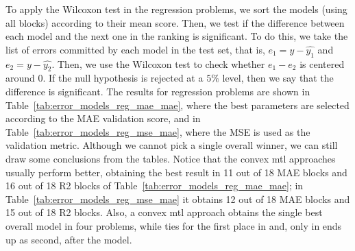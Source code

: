 %
To apply the Wilcoxon test in the regression problems, we sort the models (using all blocks) according to their mean score. Then, we test if the difference between each model and the next one in the ranking is significant. To do this, we take the list of errors committed by each model in the test set, that is, $e_1 = y - \hat{y_1}$ and $e_2 = y - \hat{y_2}$. Then, we use the Wilcoxon test to check whether $e_1 - e_2$ is centered around 0.
If the null hypothesis is rejected at a $5\%$ level, then we say that the difference is significant.
%
%
The results for regression problems are shown in Table~\ref{tab:error_models_reg_mae_mae}, where the best parameters are selected according to the MAE validation score, and in Table~\ref{tab:error_models_reg_mse_mae}, where the MSE is used as the validation metric.
%
Although we cannot pick a single overall winner, we can still draw some conclusions from the tables. Notice that the convex \acrshort{mtl} approaches usually perform better, obtaining the best result in 11 out of 18 MAE blocks and 16 out of 18 R2 blocks of Table~\ref{tab:error_models_reg_mae_mae}; in Table~\ref{tab:error_models_reg_mse_mae} it obtains 12 out of 18 MAE blocks and 15 out of 18 R2 blocks.
Also, a convex \acrshort{mtl} approach obtains the single best overall model in four problems, while ties for the first place in  and, only in  ends up as second, after the  model.

